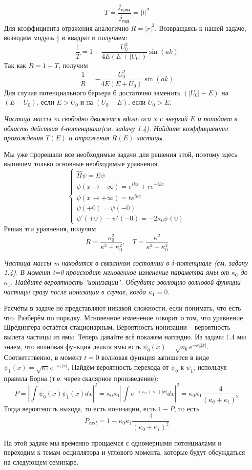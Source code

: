 \[
T = \frac{j_{\text{прох}}}{j_{\text{пад}}} = |t|^2
\]
Для коэффициента отражения аналогично $R = |r|^2$. Возвращаясь к нашей задаче, возводим модуль $\frac{1}{t}$ в квадрат и получаем:
\[
\frac{1}{T} = 1 + \frac{U_0^2}{4E(E+|U_0|)} \sin(ak)
\]
Так как $R = 1 - T$, получим 
\[
\frac{1}{R} = -\frac{U_0^2}{4E(E+U_0)} \sin(ak)
\]
Для случая потенциального барьера б достаточно заменить $(|U_0| + E)$ на $(E-U_0)$, если $E > U_0$ и на $(U_0 - E)$, если $U_0 > E$.
\begin{center}
    \textit{Частица массы m свободно движется вдоль оси $x$ с энергий $E$ и попадает в область действия $\delta$-потенциала(см. задачу 1.4). Найдите коэффициенты прохождения $T(E)$ и отражения $R(E)$ частицы.}
\end{center}
Мы уже прорешали все необходимые задачи для решения этой, поэтому здесь выпишем только основные необходимые уравнения.
\[
\begin{cases}
\hat H \psi = E \psi \\
\psi(x\rightarrow -\infty) = e^{ikx} + re^{-ikx}\\
\psi(x\rightarrow +\infty) = te^{ikx}\\
\psi(+0) = \psi(-0)\\
\psi'(+0) - \psi'(-0) = -2\kappa_0\psi(0)
\end{cases}
\]
Решая эти уравнения, получим
\[
R = \frac{\kappa_0^2}{\kappa^2+\kappa^2_0}, \quad T = \frac{\kappa^2}{\kappa^2 + \kappa^2_0}
\]

\begin{center}
    \textit{Частица массы m находится в связанном состоянии в $\delta$-потенциале (см. задачу 1.4). В момент t=0 происходит мгновенное изменение параметра ямы от $\kappa_0$ до $\kappa_1$. Найдите вероятность "ионизации". Обсудите эволюцию волновой функции частицы сразу после ионизации в случае, когда $\kappa_1=0$.}
\end{center}
Расчёты в задаче не представляют никакой сложности, если понимать, что есть что. Разберём по порядку. Мгновенное изменение говорит о том, что уравнение Шрёдингера остаётся стационарным. Вероятность ионизации – вероятность вылета частицы из ямы. Теперь давайте всё покажем наглядно. Из задачи 1.4 мы знаем, что волновая функция дельта ямы есть $\psi_0(x) = \sqrt{\kappa_0}e^{-\kappa_0|x|}$. Соответственно, в момент $t=0$ волновая функция запишется в виде $\psi_1(x) = \sqrt{\kappa_1}e^{-\kappa_1 |x|}$. Найдём вероятность перехода от $\psi_0$ к $\psi_1$, используя правила Борна (т.е. через скалярное произведение):
\[
P = |\int\psi_0(x)\psi_1(x)dx|^2 =\kappa_0\kappa_1|\int e^{-(\kappa_0 + \kappa_1)|x|}dx|^2 = \kappa_0\kappa_1\frac{4}{(\kappa_0 + \kappa_1)^2}
\]
Тогда вероятность выхода, то есть ионизации, есть $1 - P$, то есть
\[
P_{exit} = 1 - \kappa_0\kappa_1\frac{4}{(\kappa_0 + \kappa_1)^2}
\]

На этой задаче мы временно прощаемся с одномерными потенциалами и переходим к темам осциллятора и углового момента, которые будут обсуждаться на следующем семинаре. 